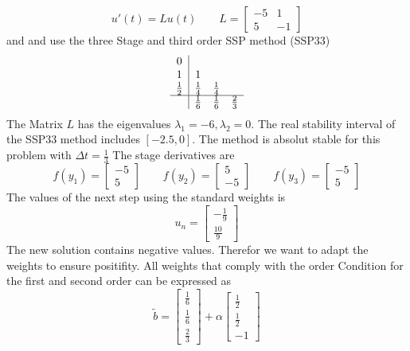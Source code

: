 \documentclass[a4paper]{scrartcl}
\numberwithin{equation}{section}
\theoremstyle{plain}
\theoremstyle{definition}
\numberwithin{theorem}{section}
\newcommand{\dt}{{\Delta t}}
\newcommand{\1}{\mathbbm{1}}
\begin{document}
\begin{equation}
u'(t) = L u(t) \qquad L = \left[\begin{matrix}- 5 & 1\\5 & -1\end{matrix}\right] 
\end{equation}
and and use the three Stage and third order SSP method (SSP33)
\begin{align}
\begin{array}{c|ccc}
0 &  &  & \\
1 & 1 &  & \\
\frac{1}{2} & \frac{1}{4} & \frac{1}{4} & \\
\hline
 & \frac{1}{6} & \frac{1}{6} & \frac{2}{3}\\
\end{array}
\end{align}
The Matrix $L$ has the eigenvalues $\lambda_1 = -6,\lambda_2=0$. The real stability interval of the SSP33 method includes $[-2.5,0]$. The method is absolut stable for this problem with $\dt = \frac{1}{3}$
The stage derivatives are
\begin{equation}
f(y_1)=\left[\begin{matrix}-5\\5\end{matrix}\right]\qquad f(y_2)=\left[\begin{matrix}5\\-5\end{matrix}\right]\qquad f(y_3)=\left[\begin{matrix}-5\\5\end{matrix}\right]\end{equation}
The values of the next step using the standard weights is
\begin{equation}
u_n=\left[\begin{matrix}- \frac{1}{9}\\\frac{10}{9}\end{matrix}\right]
\end{equation}
The new solution contains negative values. 
Therefor we want to adapt the weights to ensure positifity. 
All weights that comply with the order Condition for the first and second order can be expressed as
\begin{equation}
\tilde b=\left[\begin{matrix}\frac{1}{6}\\\frac{1}{6}\\\frac{2}{3}\end{matrix}\right]+\alpha \left[\begin{matrix}\frac{1}{2}\\\frac{1}{2}\\-1\end{matrix}\right]
\end{equation}
\end{document}
